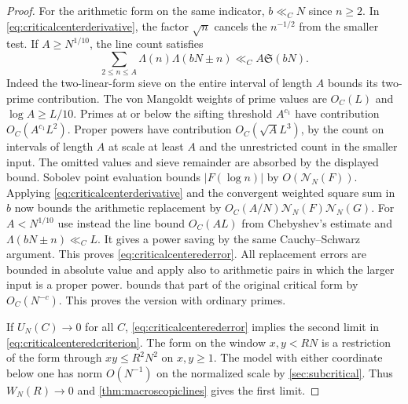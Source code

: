 \documentclass[11pt,a4paper]{article}
\numberwithin{equation}{section}
\newcommand{\SSS}{\mathfrak S}
\newcommand{\NN}{\mathcal N_N}
\begin{document}
\begin{proof}
For the arithmetic form on the same indicator,
$b\ll_C N$ since $n\ge2$. In
\cref{eq:criticalcenterderivative}, the factor $\sqrt n$
cancels the $n^{-1/2}$ from the smaller test. If
$A\ge N^{1/10}$, the line count satisfies
\[
 \sum_{2\le n\le A}\Lambda(n)\Lambda(bN\pm n)
          \ll_C A\SSS(bN) .
\]
Indeed the two-linear-form sieve on the entire interval
of length $A$ bounds its two-prime contribution.
The von Mangoldt weights of prime values are $O_C(L)$
and $\log A\ge L/10$. Primes at or below the sifting
threshold $A^{c_1}$ have contribution $O_C(A^{c_1}L^2)$.
Proper powers have contribution $O_C(\sqrt A L^3)$,
by the count on intervals of length $A$ at scale at least
$A$ and the unrestricted count in the smaller input.
The omitted values and sieve remainder are absorbed by
the displayed bound. Sobolev point evaluation bounds
$|F(\log n)|$ by $O(\NN(F))$. Applying
\cref{eq:criticalcenterderivative} and the convergent
weighted square sum in $b$ now bounds the arithmetic
replacement by $O_C(A/N)\NN(F)\NN(G)$.
For $A<N^{1/10}$ use instead the line bound $O_C(AL)$
from Chebyshev's estimate and $\Lambda(bN\pm n)\ll_C L$.
It gives a power saving by the same Cauchy--Schwarz argument.
This proves \cref{eq:criticalcenterederror}.
All replacement errors are bounded in absolute value and
apply also to arithmetic pairs in which the larger input
is a proper power.  bounds that
part of the original critical form by $O_C(N^{-c})$.
This proves the version with ordinary primes.

If $U_N(C)\to0$ for all $C$, \cref{eq:criticalcenterederror}
implies the second limit in \cref{eq:criticalcenteredcriterion}.
The form on the window $x,y<RN$ is a restriction of the
form through $xy\le R^2N^2$ on $x,y\ge1$. The model with
either coordinate below one has norm $O(N^{-1})$ on the
normalized scale by \cref{sec:subcritical}. Thus $W_N(R)\to0$
and \cref{thm:macroscopiclines} gives the first limit.


\end{proof}
\end{document}
